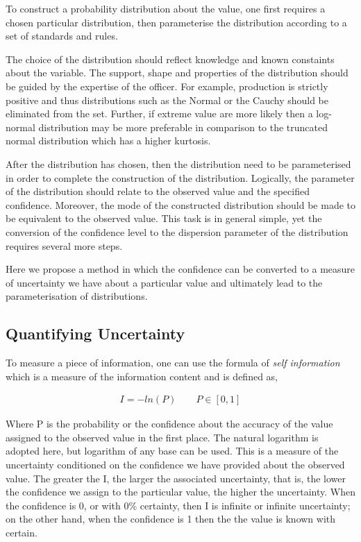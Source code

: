 \documentclass[nojss]{jss}\usepackage[]{graphicx}\usepackage[]{color}
\begin{document}

To construct a probability distribution about the value, one
first requires a chosen particular distribution, then parameterise the
distribution according to a set of standards and rules.

The choice of the distribution should reflect knowledge and known
constaints about the variable. The support, shape and properties of
the distribution should be guided by the expertise of the officer. For
example, production is strictly positive and thus distributions such
as the Normal or the Cauchy should be eliminated from the
set. Further, if extreme value are more likely then a log-normal
distribution may be more preferable in comparison to the truncated
normal distribution which has a higher kurtosis. 

After the distribution has chosen, then the distribution need to be
parameterised in order to complete the construction of the
distribution. Logically, the parameter of the distribution should
relate to the observed value and the specified confidence. Moreover,
the mode of the constructed distribution should be made to be
equivalent to the observed value. This task is in general simple, yet
the conversion of the confidence level to the dispersion parameter of
the distribution requires several more steps. 

Here we propose a method in which the confidence can be converted to a
measure of uncertainty we have about a particular value and ultimately
lead to the parameterisation of distributions.


\subsection{Quantifying Uncertainty}

To measure a piece of information, one can use the formula of
\textit{self information} which is a measure of the information
content and is defined as,

\begin{align}
  \label{eqn:si}
  I = -ln(P) \qquad P \in [0, 1]
\end{align}


Where P is the probability or the confidence about the accuracy of the
value assigned to the observed value in the first place. The natural
logarithm is adopted here, but logarithm of any base can be used. This
is a measure of the uncertainty conditioned on the confidence we have
provided about the observed value. The greater the I, the larger the
associated uncertainty, that is, the lower the confidence we assign to
the particular value, the higher the uncertainty. When the confidence
is 0, or with 0\% certainty, then I is infinite or infinite
uncertainty; on the other hand, when the confidence is 1 then the the
value is known with certain.
\end{document}
